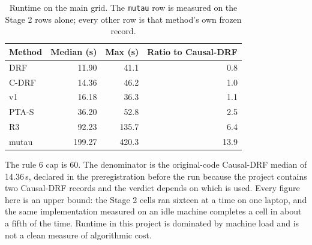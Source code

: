 \begin{table}[htbp]
\centering
\caption{Runtime on the main grid. The \texttt{mutau} row is measured on the Stage 2 rows alone; every other row is that method's own frozen record.}
\label{tab:p55s2-cost}
\scriptsize
\begin{tabular}{@{}lrrr@{}}
\toprule
Method & Median (s) & Max (s) & Ratio to Causal-DRF \\
\midrule
DRF & 11.90 & 41.1 & 0.8 \\
C-DRF & 14.36 & 46.2 & 1.0 \\
v1 & 16.18 & 36.3 & 1.1 \\
PTA-S & 36.20 & 52.8 & 2.5 \\
R3 & 92.23 & 135.7 & 6.4 \\
mutau & 199.27 & 420.3 & 13.9 \\
\bottomrule
\end{tabular}
\par\vspace{2pt}\parbox{0.92\textwidth}{\scriptsize The rule 6 cap is 60. The denominator is the original-code Causal-DRF median of 14.36\,s, declared in the preregistration before the run because the project contains two Causal-DRF records and the verdict depends on which is used. Every figure here is an upper bound: the Stage 2 cells ran sixteen at a time on one laptop, and the same implementation measured on an idle machine completes a cell in about a fifth of the time. Runtime in this project is dominated by machine load and is not a clean measure of algorithmic cost.}
\end{table}
